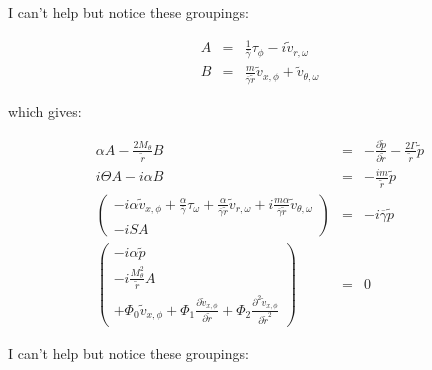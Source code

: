 I can't help but notice these groupings:

\begin{eqnarray}
A &=& 
\frac{1}{\overline{\gamma}} \tau_{\phi}
-i \widetilde{v}_{r,\omega}
\nonumber
\\
B &=&
\frac{m}{\overline{\gamma} \widetilde{r}} \widetilde{v}_{x,\phi}
+ \widetilde{v}_{\theta,\omega}
\nonumber
\end{eqnarray}

which gives:

\begin{eqnarray}
\alpha A
-\frac{2 M_{\theta}}{\widetilde{r}} B 
&=&
-
\frac{\partial \widetilde{p} }{\partial \widetilde{r}} 
-
\frac{2 \Gamma}{\widetilde{r}} \widetilde{p}
\nonumber
\\
i \Theta A
-
i \alpha B
&=&
-\frac{i m }{\widetilde{r} } \widetilde{p}
\nonumber
\\
\left(
\begin{array}{r}
-i \alpha
\widetilde{v}_{x,\phi} 
+ 
\frac{\alpha}{\overline{\gamma}}
\tau_{\omega}
+
\frac{ \alpha }{\overline{\gamma}
\widetilde{r}}
 \widetilde{v}_{r,\omega}
+i 
 \frac{m \alpha}{\overline{\gamma} \widetilde{r}} \widetilde{v}_{\theta,\omega}
\\
-i
S A
\end{array}
\right)
&=&
-i \overline{\gamma} \widetilde{p}
\nonumber
\\
\left(
\begin{array}{r}
-i
\alpha
 \widetilde{p}
\\
-i
\frac{M_{\theta}^2}{\widetilde{r}}
A
\\
+ 
\Phi_0 
\widetilde{v}_{x,\phi}
+\Phi_1 
\frac{\partial
\widetilde{v}_{x,\phi}
}{\partial \widetilde{r}} 
+\Phi_2 
\frac{\partial^2
\widetilde{v}_{x,\phi}
}{\partial \widetilde{r}^2} 
\end{array}
\right)
&=&
0
\nonumber
\end{eqnarray}

I can't help but notice these groupings:
